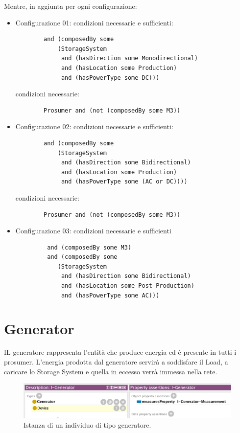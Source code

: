Mentre, in aggiunta per ogni configurazione:
\begin{itemize}
    \item Configurazione 01: condizioni necessarie e sufficienti: \begin{verbatim}
        and (composedBy some 
            (StorageSystem 
             and (hasDirection some Monodirectional) 
             and (hasLocation some Production) 
             and (hasPowerType some DC)))
    \end{verbatim}
          condizioni necessarie: \begin{verbatim}
        Prosumer and (not (composedBy some M3))
    \end{verbatim}
    \item Configurazione 02: condizioni necessarie e sufficienti: \begin{verbatim}
        and (composedBy some 
            (StorageSystem 
             and (hasDirection some Bidirectional) 
             and (hasLocation some Production) 
             and (hasPowerType some (AC or DC))))
    \end{verbatim}
          condizioni necessarie: \begin{verbatim}
        Prosumer and (not (composedBy some M3))
    \end{verbatim}
    \item Configurazione 03: condizioni necessarie e sufficienti \begin{verbatim}
         and (composedBy some M3) 
         and (composedBy some 
            (StorageSystem 
             and (hasDirection some Bidirectional) 
             and (hasLocation some Post-Production)
             and (hasPowerType some AC)))
    \end{verbatim}
\end{itemize}


\section{Generator}
IL generatore rappresenta l'entità che produce energia ed è presente in tutti i prosumer.
L'energia prodotta dal generatore servirà a soddisfare il Load, a caricare lo Storage System e quella in eccesso verrà immessa nella rete.
\begin{figure}[H]
    \centering
    \includegraphics[width=12cm]{images/individual_generator.png}
    \caption{Istanza di un individuo di tipo generatore.}
    \label{fig:individual_generator}
\end{figure}

